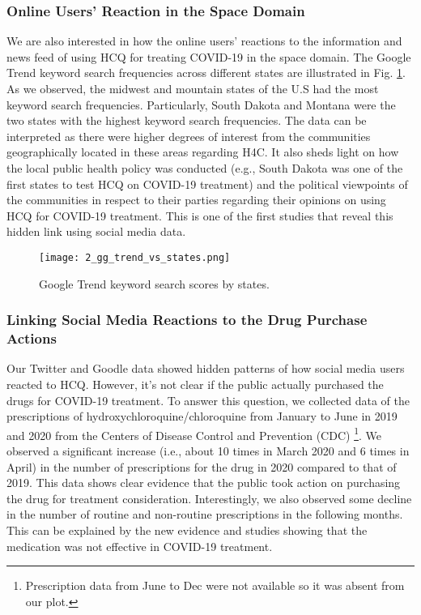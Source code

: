 \documentclass[conference]{IEEEtran}
\begin{document}
	\subsubsection{Online Users' Reaction in the Space Domain}
	We are also interested in how the online users' reactions to the information and news feed of using HCQ for treating COVID-19 in the space domain. The Google Trend keyword search frequencies across different states are illustrated in Fig. \ref{fig:2_gg_trend_vs_states}. As we observed, the midwest and mountain states of the U.S had the most keyword search frequencies. Particularly, South Dakota and Montana were the two states with the highest keyword search frequencies.
	The data can be interpreted as there were higher degrees of interest from the communities geographically located in these areas regarding H4C. It also sheds light on how the local public health policy was conducted (e.g., South Dakota was one of the first states to test HCQ on COVID-19 treatment) and the political viewpoints of the communities in respect to their parties regarding their opinions on using HCQ for COVID-19 treatment. This is one of the first studies that reveal this hidden link using social media data.   
	\begin{figure}[tb]
		\centering
		\texttt{[image: 2\_gg\_trend\_vs\_states.png]} 
		\caption{Google Trend keyword search scores by states.} 
		\label{fig:2_gg_trend_vs_states} 
	\end{figure}
	
	\subsubsection{Linking Social Media Reactions to the Drug Purchase Actions}
	Our Twitter and Goodle data showed hidden patterns of how social media users reacted to HCQ. However, it's not clear if the public actually purchased the drugs for COVID-19 treatment. To answer this question, we collected data of the prescriptions of hydroxychloroquine/chloroquine from January to June in 2019 and 2020 from the Centers of Disease Control and Prevention (CDC) \cite{b8}\footnote{Prescription data from June to Dec were not available so it was absent from our plot.}. We observed a significant increase (i.e., about 10 times in March 2020 and 6 times in April) in the number of prescriptions for the drug in 2020 compared to that of 2019. 
	This data shows clear evidence that the public took action on purchasing the drug for treatment consideration. Interestingly, we also observed some decline in the number of routine and non-routine prescriptions in the following months. This can be explained by the new evidence and studies showing that the medication was not effective in COVID-19 treatment\cite{b8}.
	
\end{document}
